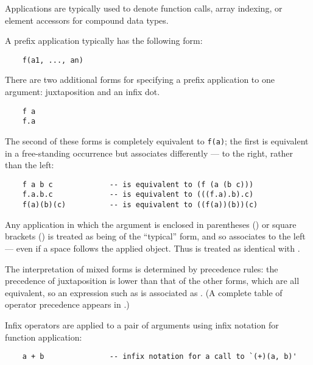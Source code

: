 Applications are typically used to denote function calls, array indexing,
or element accessors for compound data types.

A prefix application typically has the following form:

\begin{small}
\begin{verbatim}
    f(a1, ..., an)
\end{verbatim}
\end{small}

There are two additional forms for specifying a prefix 
application to one argument: juxtaposition
and an infix dot.

\begin{small}
\begin{verbatim}
    f a
    f.a
\end{verbatim}
\end{small}

The second of these forms is completely equivalent to {\tt f(a)}; the
first is equivalent in a free-standing occurrence but associates
differently --- to the right, rather than the left:

\begin{small}
\begin{verbatim}
    f a b c             -- is equivalent to (f (a (b c)))
    f.a.b.c             -- is equivalent to (((f.a).b).c)
    f(a)(b)(c)          -- is equivalent to ((f(a))(b))(c)
\end{verbatim}
\end{small}

Any application in which the argument is enclosed in parentheses
(\ttin{( )}) or square brackets (\ttin{[ ]}) is treated as being of
the ``typical'' form, and so associates to the left --- even if a
space follows the applied object.  Thus  is treated
as identical with .

The interpretation of mixed forms is determined by precedence rules:
the precedence of juxtaposition is lower than that of the other forms,
which are all equivalent, so an expression such as
 is associated as
.  (A complete table of \asharp{}
operator precedence appears in .)

Infix operators are applied to a pair of arguments using infix notation
for function application:

\begin{small}
\begin{verbatim}
    a + b               -- infix notation for a call to `(+)(a, b)'
\end{verbatim}
\end{small}

